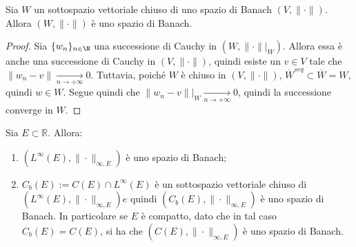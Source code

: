 \begin{proposition}[$*$]\label{prop: 4.3}
    Sia $W$ un sottospazio vettoriale chiuso di uno spazio di Banach $(V,\|\cdot\|)$. Allora $(W,\|\cdot\|)$ è uno spazio di Banach.
\end{proposition}
\begin{proof}
    Sia $\{w_n\}_{n\in \N}$ una successione di Cauchy in $\left(W, \|\cdot \|\big|_W\right)$. Allora essa è anche una successione di Cauchy in $(V, \|\cdot\|)$, quindi esiste un $v\in V$ tale che $\|w_n-v\|\xrightarrow[n\to+\infty]{} 0$. Tuttavia, poiché $W$ è chiuso in $(V,\|\cdot\|)$, $\overline {W}^{seq}\subset \overline W = W$, quindi $w\in W$. Segue quindi che $\|w_n-v\|\big|_W\xrightarrow[n\to+\infty]{} 0$, quindi la successione converge in $W$.
\end{proof}
\begin{shadedTheorem}[$**$]\label{thm: 4.2}
    Sia $E \subset \mathbb{R}$. Allora:
    \begin{enumerate}
        \item $\left(L^{\infty}(E),\|\cdot\|_{\infty, E}\right)$ è uno spazio di Banach;
        \item $C_{b}(E):=C(E) \cap L^{\infty}(E)$ è un sottospazio vettoriale chiuso di $\left(L^{\infty}(E),\|\cdot\|_{\infty, E}\right) e$ quindi $\left(C_{b}(E),\|\cdot\|_{\infty, E}\right)$ è uno spazio di Banach. In particolare se $E$ è compatto, dato che in tal caso $C_{b}(E)=C(E)$, si ha che $\left(C(E),\|\cdot\|_{\infty, E}\right)$ è uno spazio di Banach.
    \end{enumerate}
\end{shadedTheorem}
